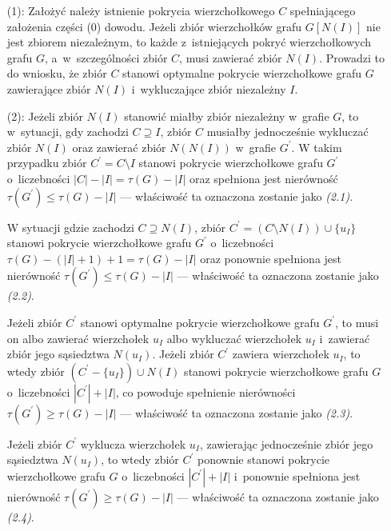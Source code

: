 {\begin{bproof}
\begin{itemize}
      W sytuacji gdy $I = X$, to ponieważ $Y \neq \emptyset$, tak jak w~poprzednim przypadku spełniona jest nierówność $|Y|\geq|I|-|X|+1$.
      Ponieważ zbiór $I$ jest niezależny w~grafie $G$, zastąpienie zbioru $Y \cup X$ zbiorem $N(I)$ w~pokryciu wierzchołkowym $C$ owocuje pokryciem wierzchołkowym $C^\prime$ grafu $G$ o~liczebności $|C^\prime| \leq |C|$.
      Wobec tego toku rozumowania łatwo zauważyć, że zbiór $C^\prime$ stanowi pokrycie wierzchołkowe grafu $G$ o~najmniejszej liczebności, które zawiera zbiór $N(I)$ oraz wyklucza zbiór niezależny $I$.
      \item[(1):] Założyć należy istnienie pokrycia wierzchołkowego $C$ spełniającego założenia części (0) dowodu.
      Jeżeli zbiór wierzchołków grafu $G[N(I)]$ nie jest zbiorem niezależnym, to każde z~istniejących pokryć wierzchołkowych grafu $G$, a~w~szczególności zbiór $C$, musi zawierać zbiór $N(I)$.
      Prowadzi to do wniosku, że zbiór $C$ stanowi optymalne pokrycie wierzchołkowe grafu $G$ zawierające zbiór $N(I)$ i~wykluczające zbiór niezależny $I$.
      \item[(2):] Jeżeli zbiór $N(I)$ stanowić miałby zbiór niezależny w~grafie $G$, to w~sytuacji, gdy zachodzi $C \supseteq I$, zbiór $C$ musiałby jednocześnie wykluczać zbiór $N(I)$ oraz zawierać zbiór $N(N(I))$ w~grafie $G^\prime$.
      W takim przypadku zbiór $C^\prime=C \setminus I$ stanowi pokrycie wierzchołkowe grafu $G^\prime$ o~liczebności $|C|-|I|=\tau(G)-|I|$ oraz spełniona jest nierówność $\tau(G^\prime)\leq\tau(G)-|I|$ --- właściwość ta oznaczona zostanie jako \textit{(2.1)}.

      W sytuacji gdzie zachodzi $C \supseteq N(I)$, zbiór $C^\prime=(C \setminus N(I))\cup \{u_I\}$ stanowi pokrycie wierzchołkowe grafu $G^\prime$ o~liczebności $\tau(G)-(|I|+1)+1=\tau(G)-|I|$ oraz ponownie spełniona jest nierówność $\tau(G^\prime)\leq\tau(G)-|I|$ --- właściwość ta oznaczona zostanie jako \textit{(2.2)}.

      Jeżeli zbiór $C^\prime$ stanowi optymalne pokrycie wierzchołkowe grafu $G^\prime$, to musi on albo zawierać wierzchołek $u_I$ albo wykluczać wierzchołek $u_I$ i~zawierać zbiór jego sąsiedztwa $N(u_I)$.
      Jeżeli zbiór $C^\prime$ zawiera wierzchołek $u_I$, to wtedy zbiór $(C^\prime - \{u_I\}) \cup N(I)$ stanowi pokrycie wierzchołkowe grafu $G$ o~liczebności $|C^\prime|+|I|$, co powoduje spełnienie nierówności $\tau(G^\prime)\geq \tau(G)-|I|$ --- właściwość ta oznaczona zostanie jako \textit{(2.3)}.

      Jeżeli zbiór $C^\prime$ wyklucza wierzchołek $u_I$, zawierając jednocześnie zbiór jego sąsiedztwa $N(u_I)$, to wtedy zbiór $C^\prime$ ponownie stanowi pokrycie wierzchołkowe grafu $G$ o~liczebności $|C^\prime|+|I|$ i~ponownie spełniona jest nierówność $\tau(G^\prime)\geq \tau(G)-|I|$ --- właściwość ta oznaczona zostanie jako \textit{(2.4)}.


\end{itemize}
\end{bproof}}
